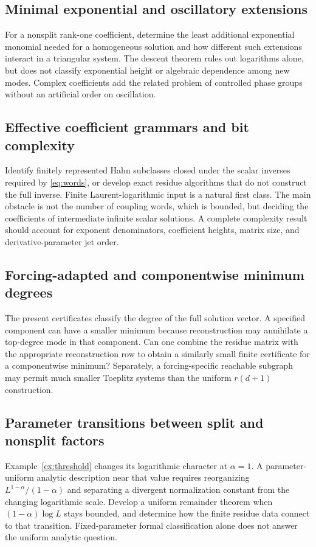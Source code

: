 \documentclass[11pt,a4paper]{article}
\numberwithin{equation}{section}
\theoremstyle{definition}
\theoremstyle{remark}\newtheorem{remark}[theorem]{Remark}
\begin{document}
\subsection{Minimal exponential and oscillatory extensions}
For a nonsplit rank-one coefficient, determine the least additional exponential monomial needed for a homogeneous solution and how different such extensions interact in a triangular system. The descent theorem rules out logarithms alone, but does not classify exponential height or algebraic dependence among new modes. Complex coefficients add the related problem of controlled phase groups without an artificial order on oscillation.

\subsection{Effective coefficient grammars and bit complexity}
Identify finitely represented Hahn subclasses closed under the scalar inverses required by \eqref{eq:words}, or develop exact residue algorithms that do not construct the full inverse. Finite Laurent-logarithmic input is a natural first class. The main obstacle is not the number of coupling words, which is bounded, but deciding the coefficients of intermediate infinite scalar solutions. A complete complexity result should account for exponent denominators, coefficient heights, matrix size, and derivative-parameter jet order.

\subsection{Forcing-adapted and componentwise minimum degrees}
The present certificates classify the degree of the full solution vector. A specified component can have a smaller minimum because reconstruction may annihilate a top-degree mode in that component. Can one combine the residue matrix with the appropriate reconstruction row to obtain a similarly small finite certificate for a componentwise minimum? Separately, a forcing-specific reachable subgraph may permit much smaller Toeplitz systems than the uniform $r(d+1)$ construction.

\subsection{Parameter transitions between split and nonsplit factors}
Example~\ref{ex:threshold} changes its logarithmic character at $\alpha=1$. A parameter-uniform analytic description near that value requires reorganizing $L^{1-\alpha}/(1-\alpha)$ and separating a divergent normalization constant from the changing logarithmic scale. Develop a uniform remainder theorem when $(1-\alpha)\log L$ stays bounded, and determine how the finite residue data connect to that transition. Fixed-parameter formal classification alone does not answer the uniform analytic question.
\end{document}
